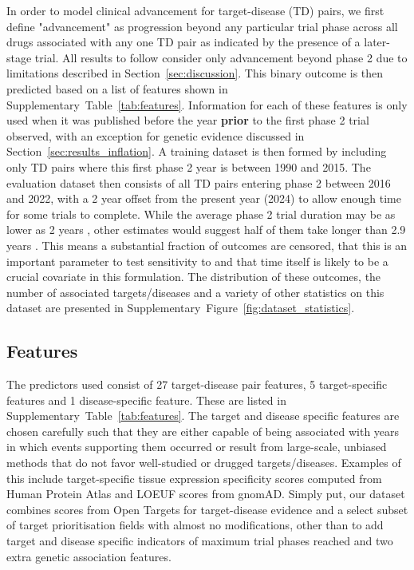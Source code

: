 \documentclass{article}
\begin{document}
In order to model clinical advancement for target-disease (TD) pairs, we first define "advancement" as progression beyond any particular trial phase across all drugs associated with any one TD pair as indicated by the presence of a later-stage trial. All results to follow consider only advancement beyond phase 2 due to limitations described in Section~\ref{sec:discussion}. This binary outcome is then predicted based on a list of features shown in Supplementary~Table~\ref{tab:features}. Information for each of these features is only used when it was published before the year \textbf{prior} to the first phase 2 trial observed, with an exception for genetic evidence discussed in Section~\ref{sec:results_inflation}. A training dataset is then formed by including only TD pairs where this first phase 2 year is between 1990 and 2015. The evaluation dataset then consists of all TD pairs entering phase 2 between 2016 and 2022, with a 2 year offset from the present year (2024) to allow enough time for some trials to complete. While the average phase 2 trial duration may be as lower as 2 years \cite{fdaStepClinical}, other estimates would suggest half of them take longer than 2.9 years \cite{PMID:29394327}. This means a substantial fraction of outcomes are censored, that this is an important parameter to test sensitivity to and that time itself is likely to be a crucial covariate in this formulation. The distribution of these outcomes, the number of associated targets/diseases and a variety of other statistics on this dataset are presented in Supplementary~Figure~\ref{fig:dataset_statistics}.

\subsection{Features}

The predictors used consist of 27 target-disease pair features, 5 target-specific features and 1 disease-specific feature. These are listed in Supplementary~Table~\ref{tab:features}. The target and disease specific features are chosen carefully such that they are either capable of being associated with years in which events supporting them occurred or result from large-scale, unbiased methods that do not favor well-studied or drugged targets/diseases. Examples of this include target-specific tissue expression specificity scores computed from Human Protein Atlas \cite{PMID:25613900} and LOEUF \cite{PMID:32461654} scores from gnomAD. Simply put, our dataset combines scores from Open Targets for target-disease evidence and a select subset of target prioritisation \cite{OT23.12release} fields with almost no modifications, other than to add target and disease specific indicators of maximum trial phases reached and two extra genetic association features.
\end{document}
